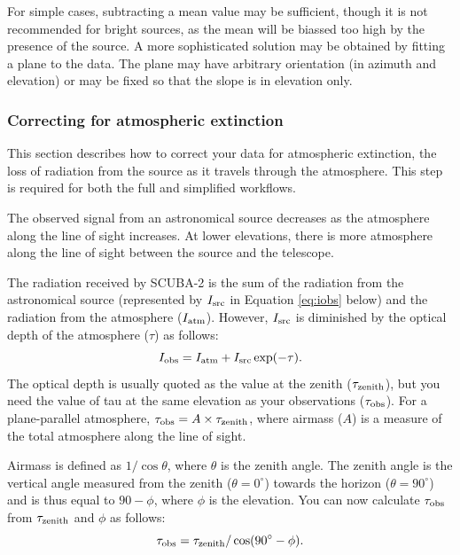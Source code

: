 \documentclass[twoside,11pt]{article}
\newcommand{\xlabel}[1]{}
\renewcommand{\_}{\texttt{\symbol{95}}}
\begin{document}
For simple cases, subtracting a mean value may be sufficient, though
it is not recommended for bright sources, as the mean will be biassed
too high by the presence of the source. A more sophisticated solution
may be obtained by fitting a plane to the data. The plane may have
arbitrary orientation (in azimuth and elevation) or may be fixed so
that the slope is in elevation only.

\subsubsection{\xlabel{extinction}Correcting for atmospheric extinction\label{se:extinction}}

This section describes how to correct your data for atmospheric
extinction, the loss of radiation from the source as it travels
through the atmosphere. This step is required for both the full and
simplified workflows.

The observed signal from an astronomical source decreases as the
atmosphere along the line of sight increases. At lower elevations,
there is more atmosphere along the line of sight between the source
and the telescope.

The radiation received by SCUBA-2 is the sum of the radiation from the
astronomical source (represented by $I_{\rm src}$ in Equation
\ref{eq:iobs} below) and the radiation from the atmosphere ($I_{\rm
  atm}$). However, $I_{\rm src}$ is diminished by the optical depth
of the atmosphere ($\tau$) as follows:
\begin{equation}
I_{\rm obs} = I_{\rm atm} + I_{\rm src} \exp(-\tau).
\label{eq:iobs}
\end{equation}
The optical depth is usually quoted as the value at the zenith
($\tau_{\rm zenith}$), but you need the value of tau at the same
elevation as your observations ($\tau_{\rm obs}$). For a
plane-parallel atmosphere, $\tau_{\rm obs} = A \times \tau_{\rm
  zenith}$, where airmass ($A$) is a measure of the total atmosphere
along the line of sight.

Airmass is defined as $1 / \cos \theta$, where $\theta$ is the zenith
angle. The zenith angle is the vertical angle measured from the zenith
($\theta = 0^\circ$) towards the horizon ($\theta = 90^\circ$) and is
thus equal to $90-\phi$, where $\phi$ is the elevation. You can now
calculate $\tau_{\rm obs}$ from $\tau_{\rm zenith}$ and $\phi$ as
follows:
\begin{equation}
\tau_{\rm obs} = \tau_{\rm zenith} / \cos(90^\circ - \phi ).
\label{eq:tau}
\end{equation}
\end{document}
